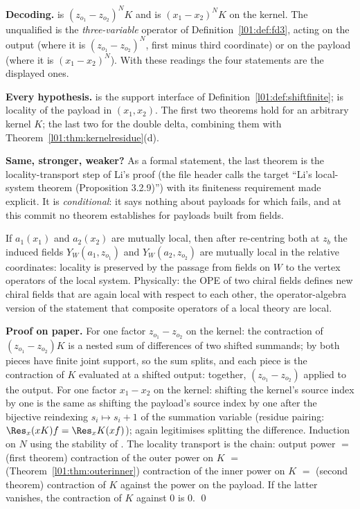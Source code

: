 \begin{dictionary}
\textbf{Decoding.}  is $(z_{o_1}-z_{o_2})^NK$ and  is
$(x_1-x_2)^NK$ on the kernel. The unqualified  is the \emph{three-variable} operator of
Definition~\ref{l01:def:fd3}, acting on the output (where it is $(z_{o_1}-z_{o_2})^N$, first minus third coordinate) or on the
payload (where it is $(x_1-x_2)^N$). With these readings the four statements are the displayed ones.

\textbf{Every hypothesis.}  is the support interface of
Definition~\ref{l01:def:shiftfinite};  is locality of the payload in $(x_1,x_2)$. The first two theorems hold for an
arbitrary kernel $K$; the last two for the double delta, combining them with Theorem~\ref{l01:thm:kernelresidue}(d).

\textbf{Same, stronger, weaker?} As a formal statement, the last theorem is the locality-transport step of Li's proof
(the file header calls the target ``Li's local-system theorem (Proposition 3.2.9)'') with its finiteness
requirement made explicit. It is \emph{conditional}: it says nothing about payloads for which  fails, and at this
commit no theorem establishes  for payloads built from fields.
\end{dictionary}

\begin{physics}
If $a_1(x_1)$ and $a_2(x_2)$ are mutually local, then after re-centring both at $z_b$ the induced fields
$Y_W(a_1,z_{o_1})$ and $Y_W(a_2,z_{o_2})$ are mutually local in the relative coordinates: locality is preserved by the
passage from fields on $W$ to the vertex operators of the local system. Physically: the OPE of two chiral fields
defines new chiral fields that are again local with respect to each other, the operator-algebra version of the
statement that composite operators of a local theory are local.
\end{physics}

\textbf{Proof on paper.} For one factor $z_{o_1}-z_{o_2}$ on the kernel: the contraction of $(z_{o_1}-z_{o_2})K$ is a nested sum of
differences of two shifted summands; by  both pieces have finite joint support, so the sum splits, and each
piece is the contraction of $K$ evaluated at a shifted output: together, $(z_{o_1}-z_{o_2})$ applied to the output. For one
factor $x_1-x_2$ on the kernel: shifting the kernel's source index by one is the same as shifting the payload's source index
by one after the bijective reindexing $s_i\mapsto s_i+1$ of the summation variable (residue pairing:
$\Res_x(xK)f = \Res_xK(xf)$); again  legitimises splitting the difference. Induction on $N$ using the stability of
. The locality transport is the chain: output power $=$ (first theorem) contraction of the outer power on $K$
$=$ (Theorem~\ref{l01:thm:outerinner}) contraction of the inner power on $K$ $=$ (second theorem) contraction of $K$ against the
power on the payload. If the latter vanishes, the contraction of $K$ against $0$ is $0$. \qed

